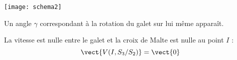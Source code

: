 \begin{center}
 \texttt{[image: schema2]}
\end{center}

\ifprof
\begin{corrige}

Un angle $\gamma$ correspondant à la rotation du galet sur lui même apparaît.

\end{corrige}
\else \fi

\ifprof
\begin{corrige}
La vitesse est nulle entre le galet et la croix de Malte est nulle au point $I$ :
$$ 
\vect{V(I,S_3/S_2)} = \vect{0}
$$
\end{corrige}
\else \fi

